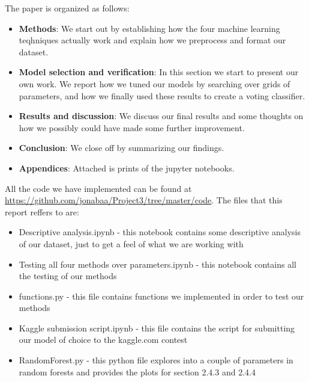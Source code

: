 \documentclass[parskip=half]{scrartcl}
\theoremstyle{definition}
\theoremstyle{remark}
\begin{document}
The paper is organized as follows: 
\begin{itemize}
    \item
        \textbf{Methods}: 
        We start out by establishing how the four machine learning 
        teqhniques actually work and explain how we preprocess and
        format our dataset.
    \item
        \textbf{Model selection and verification}:
        In this section we start to present our own work.
        We report how we tuned our models by searching
        over grids of parameters, and how
        we finally used these results to create a voting classifier.
    \item
        \textbf{Results and discussion}:
        We discuss our final results and some thoughts on how we possibly
        could have made some further improvement.
    \item
        \textbf{Conclusion}:
        We close off by summarizing our findings.
    \item
        \textbf{Appendices}:
        Attached is prints of the jupyter notebooks. 
\end{itemize}

\begin{framed}
All the code we have implemented can be found at \url{https://github.com/jonabaa/Project3/tree/master/code}. The files that this report reffers to
are:
    \begin{itemize}
        \item
            Descriptive analysis.ipynb - this notebook contains some 
            descriptive analysis of our dataset, just to get a feel of
            what we are working with
        \item
            Testing all four methods over parameters.ipynb - this notebook 
            contains all the testing of our methods
        \item
            functions.py - this file contains functions we implemented in
            order to test our methods
        \item
            Kaggle submission script.ipynb - this file contains the script
            for submitting our model of choice to the kaggle.com contest
        \item
        	RandomForest.py - this python file explores into a couple of parameters in random forests and provides the plots for section 2.4.3 and 2.4.4
    \end{itemize}
\end{framed}
\end{document}
